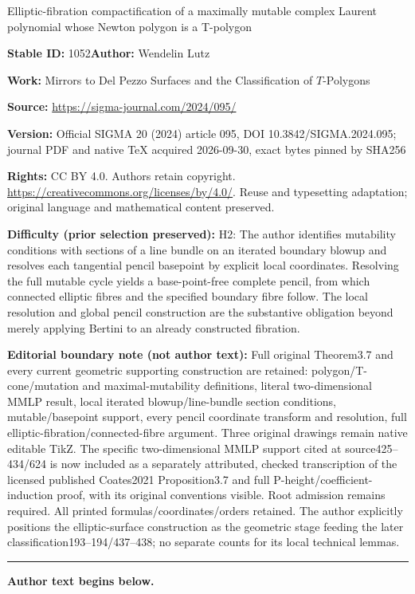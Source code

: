 \documentclass[11pt]{article}
\numberwithin{equation}{section}
\begin{document}
\begin{center}\Large Elliptic-fibration compactification of a maximally mutable complex Laurent polynomial whose Newton polygon is a T-polygon\end{center}
\noindent\textbf{Stable ID:} 1052\quad\textbf{Author:} Wendelin Lutz\par
\noindent\textbf{Work:} Mirrors to Del Pezzo Surfaces and the Classification of $T$-Polygons\par
\noindent\textbf{Source:} \url{https://sigma-journal.com/2024/095/}\par
\noindent\textbf{Version:} Official SIGMA 20 (2024) article 095, DOI 10.3842/SIGMA.2024.095; journal PDF and native TeX acquired 2026-09-30, exact bytes pinned by SHA256\par
\noindent\textbf{Rights:} CC BY 4.0. Authors retain copyright. \url{https://creativecommons.org/licenses/by/4.0/}. Reuse and typesetting adaptation; original language and mathematical content preserved.\par
\noindent\textbf{Difficulty (prior selection preserved):} {\CJKfont H2: The author identifies mutability conditions with sections of a line bundle on an iterated boundary blowup and resolves each tangential pencil basepoint by explicit local coordinates. Resolving the full mutable cycle yields a base-point-free complete pencil, from which connected elliptic fibres and the specified boundary fibre follow. The local resolution and global pencil construction are the substantive obligation beyond merely applying Bertini to an already constructed fibration.}\par
\medskip\noindent\textbf{Editorial boundary note (not author text):} Full original Theorem3.7 and every current geometric supporting construction are retained: polygon/T-cone/mutation and maximal-mutability definitions, literal two-dimensional MMLP result, local iterated blowup/line-bundle section conditions, mutable/basepoint support, every pencil coordinate transform and resolution, full elliptic-fibration/connected-fibre argument. Three original drawings remain native editable TikZ. The specific two-dimensional MMLP support cited at source425--434/624 is now included as a separately attributed, checked transcription of the licensed published Coates2021 Proposition3.7 and full P-height/coefficient-induction proof, with its original conventions visible. Root admission remains required. All printed formulas/coordinates/orders retained. The author explicitly positions the elliptic-surface construction as the geometric stage feeding the later classification193–194/437–438; no separate counts for its local technical lemmas.\par
\medskip\hrule\medskip\noindent\textbf{Author text begins below.}\par
\setcounter{section}{1}
\end{document}
